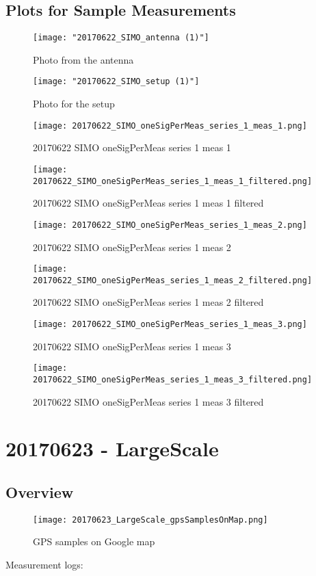 \subsection{Plots for Sample Measurements}
\begin{figure}[ht] \caption{Photo from the antenna}
\texttt{[image: "20170622\_SIMO\_antenna (1)"]}\centering\end{figure}
\begin{figure}[ht] \caption{Photo for the setup}
\texttt{[image: "20170622\_SIMO\_setup (1)"]}\centering\end{figure}
\begin{figure}[ht] \caption{20170622 SIMO oneSigPerMeas series 1 meas 1}
\texttt{[image: 20170622\_SIMO\_oneSigPerMeas\_series\_1\_meas\_1.png]}\centering\end{figure}
\begin{figure}[ht] \caption{20170622 SIMO oneSigPerMeas series 1 meas 1 filtered}
\texttt{[image: 20170622\_SIMO\_oneSigPerMeas\_series\_1\_meas\_1\_filtered.png]}\centering\end{figure}
\begin{figure}[ht] \caption{20170622 SIMO oneSigPerMeas series 1 meas 2}
\texttt{[image: 20170622\_SIMO\_oneSigPerMeas\_series\_1\_meas\_2.png]}\centering\end{figure}
\begin{figure}[ht] \caption{20170622 SIMO oneSigPerMeas series 1 meas 2 filtered}
\texttt{[image: 20170622\_SIMO\_oneSigPerMeas\_series\_1\_meas\_2\_filtered.png]}\centering\end{figure}
\begin{figure}[ht] \caption{20170622 SIMO oneSigPerMeas series 1 meas 3}
\texttt{[image: 20170622\_SIMO\_oneSigPerMeas\_series\_1\_meas\_3.png]}\centering\end{figure}
\begin{figure}[ht] \caption{20170622 SIMO oneSigPerMeas series 1 meas 3 filtered}
\texttt{[image: 20170622\_SIMO\_oneSigPerMeas\_series\_1\_meas\_3\_filtered.png]}\centering\end{figure}
\clearpage
\section{20170623 - LargeScale}
\subsection{Overview}
\begin{figure}[ht] \caption{GPS samples on Google map}
\texttt{[image: 20170623\_LargeScale\_gpsSamplesOnMap.png]}\centering\end{figure}
\begin{minipage}{\textwidth} Measurement logs:

 \end{minipage}
\clearpage
